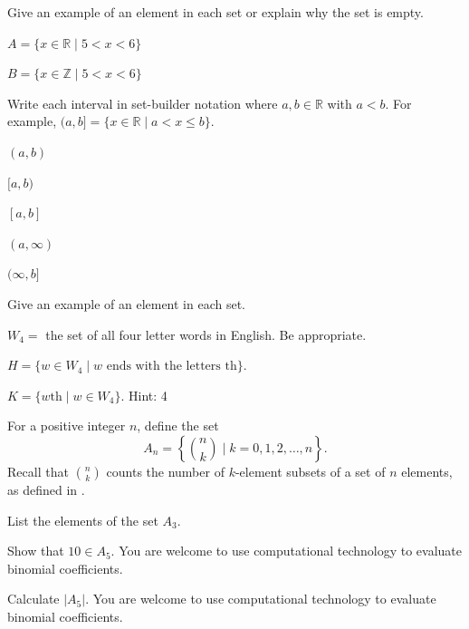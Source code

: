 \begin{exer}[\exerP] %
\label{exer_set_def_ineq}
    Give an example of an element in each set or explain why the set is empty.   
        \begin{exerpart}
            \item $A = \{ x \in \mathbb{R} \mid 5 < x < 6\}$
            \item $B =\{ x \in \mathbb{Z} \mid 5 < x < 6\}$
        \end{exerpart}
\end{exer}

\begin{exer}[\exerP] %
\label{exer_intervals_setbuilder}
    Write each interval in set-builder notation where $a, b \in \mathbb{R}$ with $a < b$. For example, $(a,b] =\{x \in \mathbb{R} \mid a < x \le b\}$.
        \begin{exerpart}
            \item $(a,b)$
            \item $[a,b)$
            \item $[a,b]$
            \item $(a,\infty)$
            \item $(\infty,b]$
        \end{exerpart}
\end{exer}

\begin{exer}[\exerU] %
\label{exer_set_4letter_words}
    Give an example of an element in each set.    
        \begin{exerpart}
            \item $W_4 =$ the set of all four letter words in English.  Be appropriate.
            \item $H= \{ w \in W_4 \mid w \text{ ends with the letters th}\}$.
            \item $K= \{ w\text{th} \mid w \in W_4\}$. Hint: 4
        \end{exerpart}
\end{exer}

\begin{exer}[\exerU] %
\label{exer_list_elements_binom}
    For a positive integer $n$, define the set $$A_n=\left\{\binom{n}{k} \mid k=0,1,2, \ldots, n \right\}.$$  Recall that $\binom{n}{k}$ counts the number of $k$-element subsets of a set of $n$ elements, as defined in .
        \begin{exerpart}
            \item List the elements of the set $A_3$.
            \item Show that $10 \in A_5$. You are welcome to use computational technology to evaluate binomial coefficients.
            \item Calculate $|A_5|$.  You are welcome to use computational technology to evaluate binomial coefficients.
        \end{exerpart}
\end{exer}

